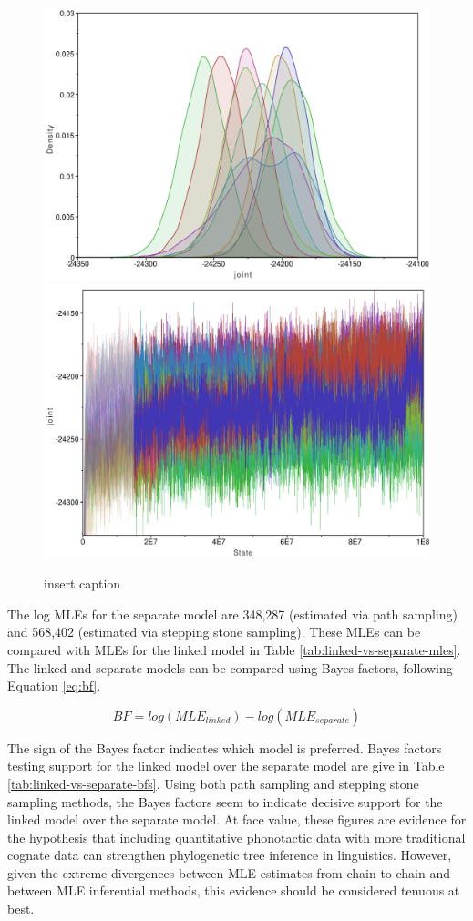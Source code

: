 \documentclass[]{article}
\begin{document}
\begin{figure}
\includegraphics[width=0.5\linewidth]{fig/sep_trace_ch1-10} \includegraphics[width=0.5\linewidth]{fig/sep_trace_dens_ch1-10} \caption{insert caption}\label{fig:separate-all-trace}
\end{figure}

The log MLEs for the separate model are 348,287 (estimated via path sampling) and 568,402 (estimated via stepping stone sampling). These MLEs can be compared with MLEs for the linked model in Table \ref{tab:linked-vs-separate-mles}. The linked and separate models can be compared using Bayes factors, following Equation \eqref{eq:bf}.

\begin{equation}
BF = log(MLE_{linked}) - log(MLE_{separate})
\label{eq:bf}
\end{equation}

The sign of the Bayes factor indicates which model is preferred. Bayes factors testing support for the linked model over the separate model are give in Table \ref{tab:linked-vs-separate-bfs}. Using both path sampling and stepping stone sampling methods, the Bayes factors seem to indicate decisive support for the linked model over the separate model. At face value, these figures are evidence for the hypothesis that including quantitative phonotactic data with more traditional cognate data can strengthen phylogenetic tree inference in linguistics. However, given the extreme divergences between MLE estimates from chain to chain and between MLE inferential methods, this evidence should be considered tenuous at best.
\end{document}
